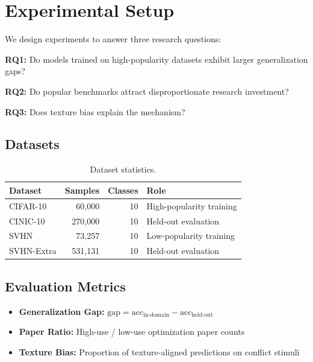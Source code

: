 \section{Experimental Setup}

We design experiments to answer three research questions:

\textbf{RQ1:} Do models trained on high-popularity datasets exhibit larger generalization gaps?

\textbf{RQ2:} Do popular benchmarks attract disproportionate research investment?

\textbf{RQ3:} Does texture bias explain the mechanism?

\subsection{Datasets}

\begin{table}[h]
\centering
\caption{Dataset statistics.}
\label{tab:datasets}
\begin{tabular}{@{}lrrl@{}}
\toprule
Dataset & Samples & Classes & Role \\
\midrule
CIFAR-10 & 60,000 & 10 & High-popularity training \\
CINIC-10 & 270,000 & 10 & Held-out evaluation \\
SVHN & 73,257 & 10 & Low-popularity training \\
SVHN-Extra & 531,131 & 10 & Held-out evaluation \\
\bottomrule
\end{tabular}
\end{table}

\subsection{Evaluation Metrics}

\begin{itemize}
    \item \textbf{Generalization Gap:} $\text{gap} = \text{acc}_{\text{in-domain}} - \text{acc}_{\text{held-out}}$
    \item \textbf{Paper Ratio:} High-use / low-use optimization paper counts
    \item \textbf{Texture Bias:} Proportion of texture-aligned predictions on conflict stimuli
\end{itemize}
